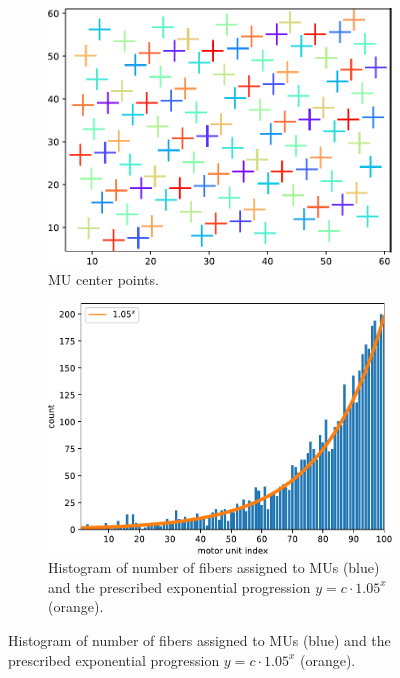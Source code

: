 \begin{figure}%
  \centering%
  \begin{subfigure}[t]{0.48\textwidth}%
    \centering%
    \includegraphics[width=\textwidth]{images/motor_unit_assignment/MU_fibre_distribution_67x67_100_mu_positions.pdf}%
    \caption{MU center points.}%
    \label{fig:MU_fibre_distribution_67x67_100_mu_positions}%
  \end{subfigure}
  \quad
  \begin{subfigure}[t]{0.48\textwidth}%
    \centering%
    \includegraphics[width=\textwidth]{images/motor_unit_assignment/MU_fibre_distribution_67x67_100_fiber_distribution.pdf}%
    \caption{Histogram of number of fibers assigned to MUs (blue) and the prescribed exponential progression $y=c\cdot 1.05^x$ (orange).}%
    \label{fig:MU_fibre_distribution_67x67_100_fiber_distribution}%
  

\end{subfigure}
\end{figure}
